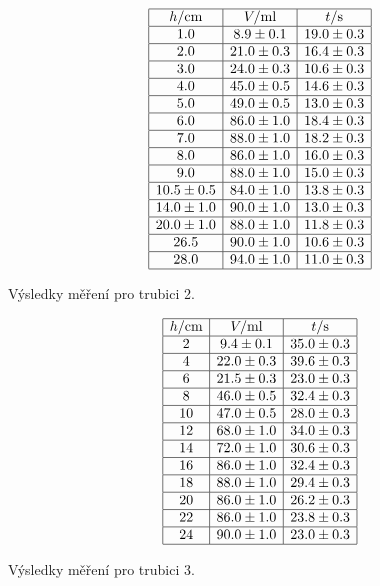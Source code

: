 \documentclass[a4paper,12pt]{article}
\begin{document}
\begin{table}
$$
\begin{array}{|c|c|c|}
\hline
h/\mbox{cm}&	V/\mbox{ml}&	t/\mbox{s}	\\ \hline
1.0&	8.9 \pm 0.1&	19.0\pm 0.3\\ \hline
2.0&	21.0 \pm 0.3&	16.4\pm 0.3\\ \hline
3.0&	24.0 \pm 0.3&	10.6\pm 0.3\\ \hline
4.0&	45.0 \pm 0.5&	14.6\pm 0.3\\ \hline
5.0&	49.0 \pm 0.5&	13.0\pm 0.3\\ \hline
6.0&	86.0 \pm 1.0 &	18.4\pm 0.3\\ \hline
7.0&	88.0 \pm 1.0&	18.2\pm 0.3\\ \hline
8.0&	86.0\pm 1.0&	16.0\pm 0.3\\ \hline
9.0&	88.0\pm 1.0&	15.0\pm 0.3\\ \hline
10.5 \pm 0.5&	84.0\pm 1.0&	13.8\pm 0.3\\ \hline
14.0 \pm 1.0&	90.0\pm 1.0&	13.0\pm 0.3\\ \hline
20.0 \pm 1.0&	88.0\pm 1.0&	11.8\pm 0.3\\ \hline
26.5&	90.0\pm 1.0&	10.6\pm 0.3\\ \hline
28.0&	94.0\pm 1.0&	11.0\pm 0.3\\ \hline
\end{array}
$$
\caption{Výsledky měření pro trubici 2.}
\label{T2}
\end{table}
\begin{table}
$$
\begin{array}{|c|c|c|}
\hline
h/\mbox{cm}&	V/\mbox{ml}&	t/\mbox{s}	\\ \hline
2&	9.4 \pm 0.1&	35.0\pm 0.3\\ \hline
4&	22.0 \pm 0.3&	39.6\pm 0.3\\ \hline
6&	21.5 \pm 0.3&	23.0\pm 0.3\\ \hline
8&	46.0 \pm 0.5&	32.4\pm 0.3\\ \hline
10&	47.0 \pm 0.5&	28.0\pm 0.3\\ \hline
12&	68.0 \pm 1.0 &	34.0\pm 0.3\\ \hline
14&	72.0\pm 1.0&	30.6\pm 0.3\\ \hline
16&	86.0\pm 1.0&	32.4\pm 0.3\\ \hline
18&	88.0\pm 1.0&	29.4\pm 0.3\\ \hline
20&	86.0\pm 1.0&	26.2\pm 0.3\\ \hline
22&	86.0\pm 1.0&	23.8\pm 0.3\\ \hline
24&	90.0\pm 1.0&	23.0\pm 0.3\\ \hline
\end{array}
$$
\caption{Výsledky měření pro trubici 3.}
\label{T3}
\end{table}
\end{document}
